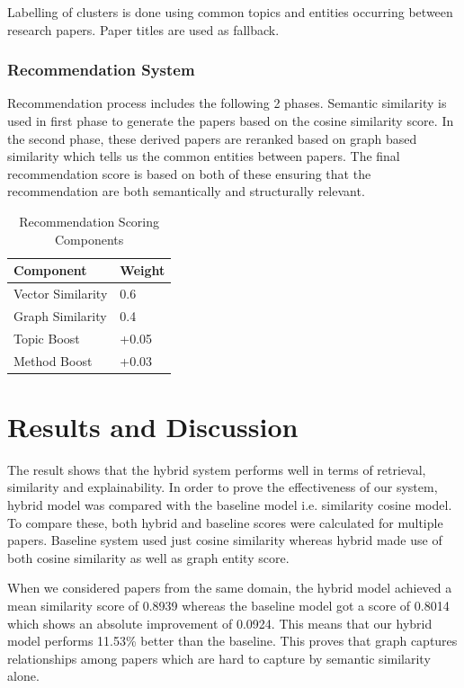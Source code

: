 \documentclass[10pt]{article}
\begin{document}
Labelling of clusters is done using common topics and entities occurring between research papers. Paper titles are used as fallback.

\subsubsection{Recommendation System}
Recommendation process includes the following 2 phases. Semantic similarity is used in first phase to generate the papers based on the cosine similarity score. In the second phase, these derived papers are reranked based on graph based similarity which tells us the common entities between papers. The final recommendation score is based on both of these ensuring that the recommendation are both semantically and structurally relevant.

\begin{table}[htbp]
\centering
\caption{Recommendation Scoring Components}
\label{tab:recommendation-scoring}
\begin{tabularx}{0.55\linewidth}{Y Y}
\toprule
\textbf{Component} & \textbf{Weight}\\
\midrule
Vector Similarity & 0.6\\
Graph Similarity & 0.4\\
Topic Boost & +0.05\\
Method Boost & +0.03\\
\bottomrule
\end{tabularx}
\end{table}

\section{Results and Discussion}
The result shows that the hybrid system performs well in terms of retrieval, similarity and explainability. In order to prove the effectiveness of our system, hybrid model was compared with the baseline model i.e. similarity cosine model. To compare these, both hybrid and baseline scores were calculated for multiple papers. Baseline system used just cosine similarity whereas hybrid made use of both cosine similarity as well as graph entity score.

When we considered papers from the same domain, the hybrid model achieved a mean similarity score of 0.8939 whereas the baseline model got a score of 0.8014 which shows an absolute improvement of 0.0924. This means that our hybrid model performs 11.53\% better than the baseline. This proves that graph captures relationships among papers which are hard to capture by semantic similarity alone.
\end{document}
